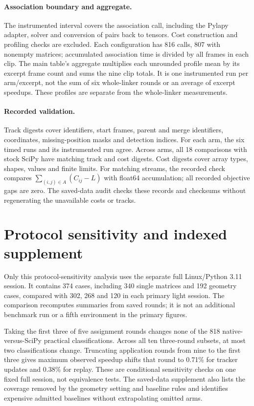 \documentclass[11pt,a4paper]{article}
\begin{document}
\paragraph{Association boundary and aggregate.}
The instrumented interval covers the association call, including the Pylapy adapter, solver and conversion of pairs back to tensors. Cost construction and profiling checks are excluded. Each configuration has 816 calls, 807 with nonempty matrices; accumulated association time is divided by all frames in each clip. The main table's aggregate multiplies each unrounded profile mean by its excerpt frame count and sums the nine clip totals. It is one instrumented run per arm/excerpt, not the sum of six whole-linker rounds or an average of excerpt speedups. These profiles are separate from the whole-linker measurements.

\paragraph{Recorded validation.}
Track digests cover identifiers, start frames, parent and merge identifiers, coordinates, missing-position masks and detection indices. For each arm, the six timed runs and its instrumented run agree. Across arms, all 18 comparisons with stock SciPy have matching track and cost digests. Cost digests cover array types, shapes, values and finite limits. For matching streams, the recorded check compares $\sum_{(i,j)\in A}(C_{ij}-L)$ with float64 accumulation; all recorded objective gaps are zero. The saved-data audit checks these records and checksums without regenerating the unavailable costs or tracks.

\FloatBarrier
\section{Protocol sensitivity and indexed supplement}\label{app:sensitivity}

Only this protocol-sensitivity analysis uses the separate full Linux/Python 3.11 session. It contains 374 cases, including 340 single matrices and 192 geometry cases, compared with 302, 268 and 120 in each primary light session. The comparison recomputes summaries from saved rounds; it is not an additional benchmark run or a fifth environment in the primary figures.

Taking the first three of five assignment rounds changes none of the 818 native-versus-SciPy practical classifications. Across all ten three-round subsets, at most two classifications change. Truncating application rounds from nine to the first three gives maximum observed speedup shifts that round to 0.71\% for tracker updates and 0.38\% for replay. These are conditional sensitivity checks on one fixed full session, not equivalence tests. The saved-data supplement also lists the coverage removed by the geometry setting and baseline rules and identifies expensive admitted baselines without extrapolating omitted arms.
\end{document}
